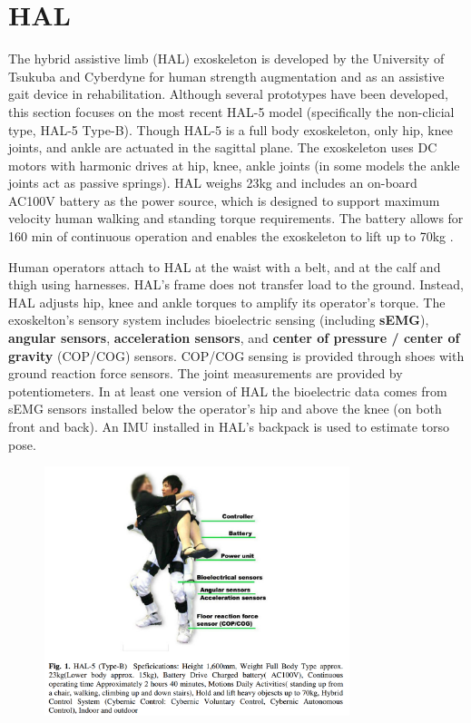 \section{HAL}
\label{exo:hal}
\begin{refsection}


The hybrid assistive limb (HAL) exoskeleton is developed by the University of Tsukuba and Cyberdyne for human strength augmentation and as an assistive gait device in rehabilitation.  Although several prototypes have been developed, this section focuses on the most recent HAL-5 model (specifically the non-clicial type, HAL-5 Type-B). Though HAL-5 is a full body exoskeleton, only hip, knee joints, and ankle are actuated in the sagittal plane.  The exoskeleton uses DC motors with harmonic drives at hip, knee, ankle joints (in some models the ankle joints act as passive springs).  HAL weighs 23kg and includes an on-board AC100V battery as the power source, which is designed to support maximum velocity human walking and standing torque requirements.  The battery allows for 160 min of continuous operation and enables the exoskeleton to lift up to 70kg \cite{HALassist2011}.  

Human operators attach to HAL at the waist with a belt, and at the calf and thigh using harnesses. HAL's frame does not transfer load to the ground.  Instead, HAL adjusts hip, knee and ankle torques to amplify its operator's torque. The exoskelton's sensory system includes bioelectric sensing (including \textbf{sEMG}), \textbf{angular sensors}, \textbf{acceleration sensors}, and \textbf{center of pressure / center of gravity} (COP/COG) sensors.  COP/COG sensing is provided through shoes with ground reaction force sensors.  The joint measurements are provided by potentiometers.
In at least one version of HAL the bioelectric data comes from sEMG sensors installed below the operator's hip and above the knee (on both front and back).
An IMU installed in HAL's backpack is used to estimate torso pose.


\begin{figure}[ht]
  \centering
  \includegraphics[width=3.5in]{exos/figs/hal-5_B_diagram.png}
\end{figure}



\end{refsection}
